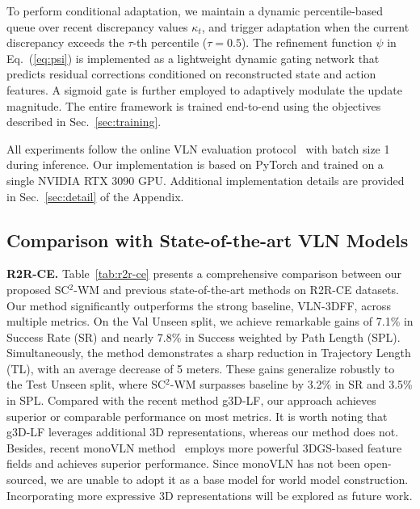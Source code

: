 \documentclass{article}
\theoremstyle{plain}
\theoremstyle{definition}
\theoremstyle{remark}
\begin{document}
To perform conditional adaptation, we maintain a dynamic percentile-based queue over recent discrepancy values $\kappa_t$, and trigger adaptation when the current discrepancy exceeds the $\tau$-th percentile (\(\tau=0.5\)). The refinement function $\psi$ in Eq.~(\ref{eq:psi}) is implemented as a lightweight dynamic gating network that predicts residual corrections conditioned on reconstructed state and action features. A sigmoid gate is further employed to adaptively modulate the update magnitude. The entire framework is trained end-to-end using the objectives described in Sec.~\ref{sec:training}.

All experiments follow the online VLN evaluation protocol~\citep{gao2024fast} with batch size 1 during inference. Our implementation is based on PyTorch and trained on a single NVIDIA RTX 3090 GPU. Additional implementation details are provided in Sec.~\ref{sec:detail} of the Appendix.








\subsection{Comparison with State-of-the-art VLN Models}






\noindent\textbf{R2R-CE.}
Table~\ref{tab:r2r-ce} presents a comprehensive comparison between our proposed SC$^2$-WM and previous state-of-the-art methods on R2R-CE datasets. Our method significantly outperforms the strong baseline, VLN-3DFF, across multiple metrics. On the {Val Unseen} split, we achieve remarkable gains of 7.1\% in Success Rate (SR) and nearly 7.8\% in Success weighted by Path Length (SPL). Simultaneously, the method demonstrates a sharp reduction in Trajectory Length (TL), with an average decrease of 5 meters. These gains generalize robustly to the {Test Unseen} split, where SC$^2$-WM surpasses baseline by 3.2\% in SR and 3.5\% in SPL. Compared with the recent method g3D-LF, our approach achieves superior or comparable performance on most metrics. It is worth noting that g3D-LF leverages additional 3D representations, whereas our method does not. Besides, recent monoVLN method~\citep{Lu2025monoVLN} employs more powerful 3DGS-based feature fields and achieves superior performance. Since monoVLN has not been open-sourced, we are unable to adopt it as a base model for world model construction. Incorporating more expressive 3D representations will be explored as future work.
\end{document}
